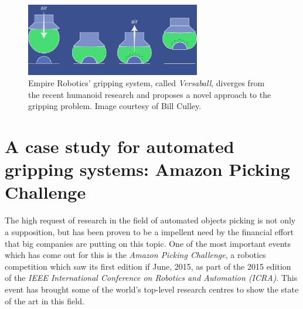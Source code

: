 \begin{figure}[htbp]
\centering
\includegraphics[width=3in]{./Graphics/versaball}
\caption{Empire Robotics' gripping system, called \emph{Versaball},
  diverges from the recent humanoid research and proposes a novel
  approach to the gripping problem. Image courtesy of Bill Culley.\label{fig:versaball}}
\end{figure}

\section{A case study for automated gripping systems: Amazon Picking
  Challenge} \label{sec:apc}
The high request of research in the field of automated objects picking
is not only a supposition, but has been proven to be a impellent need
by the financial effort that big companies are putting on this
topic. One of the most important events which has come out for this is
the \emph{Amazon Picking Challenge}, a robotics competition which saw
its first edition if June, 2015, as part of the 2015 edition of the \emph{IEEE
International Conference on Robotics and Automation (ICRA)}. This
event has brought some of the world's top-level research 
centres to show the state of the art in this field.

